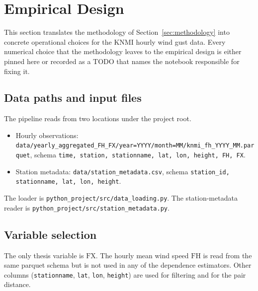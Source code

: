 \section{Empirical Design}\label{sec:empirical-design}

This section translates the methodology of
Section~\ref{sec:methodology} into concrete operational choices for
the KNMI hourly wind gust data. Every numerical choice that the
methodology leaves to the empirical design is either pinned here or
recorded as a TODO that names the notebook responsible for fixing
it.

\subsection{Data paths and input files}\label{sec:emp-paths}

The pipeline reads from two locations under the project root.

\begin{itemize}
    \item Hourly observations:
          \texttt{data/yearly\_aggregated\_FH\_FX/year=YYYY/month=MM/knmi\_fh\_YYYY\_MM.parquet},
          schema
          \texttt{time, station, stationname, lat, lon, height, FH, FX}.
    \item Station metadata:
          \texttt{data/station\_metadata.csv}, schema
          \texttt{station\_id, stationname, lat, lon, height}.
\end{itemize}

The loader is \texttt{python\_project/src/data\_loading.py}. The
station-metadata reader is
\texttt{python\_project/src/station\_metadata.py}.

\subsection{Variable selection}\label{sec:emp-vars}

The only thesis variable is \(\mathrm{FX}\). The hourly mean wind
speed \(\mathrm{FH}\) is read from the same parquet schema but is
not used in any of the dependence estimators. Other columns
(\texttt{stationname}, \texttt{lat}, \texttt{lon}, \texttt{height})
are used for filtering and for the pair distance.

